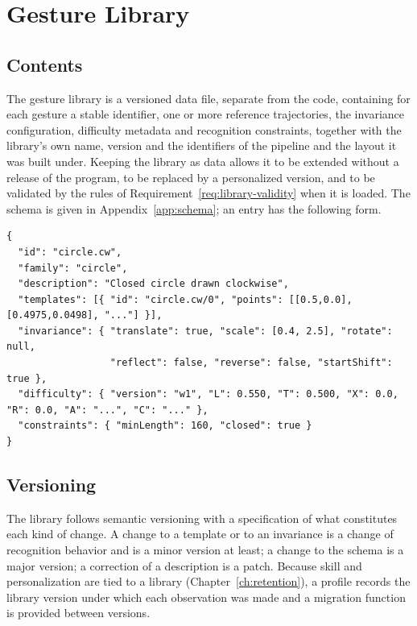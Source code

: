 \chapter{Gesture Library}\label{ch:gesture-library}

\section{Contents}

The gesture library is a versioned data file, separate from the code, containing for each gesture a stable identifier, one or more reference trajectories, the invariance configuration, difficulty metadata and recognition constraints, together with the library's own name, version and the identifiers of the pipeline and the layout it was built under. Keeping the library as data allows it to be extended without a release of the program, to be replaced by a personalized version, and to be validated by the rules of Requirement~\ref{req:library-validity} when it is loaded. The schema is given in Appendix~\ref{app:schema}; an entry has the following form.

\begin{lstlisting}[language=JSONx,caption={A library entry (abbreviated). The component values for the circle are computed from Definition~\ref{def:components} with the default constants; the ambiguity term and the total depend on the rest of the library.},label={lst:entry}]
{
  "id": "circle.cw",
  "family": "circle",
  "description": "Closed circle drawn clockwise",
  "templates": [{ "id": "circle.cw/0", "points": [[0.5,0.0],[0.4975,0.0498], "..."] }],
  "invariance": { "translate": true, "scale": [0.4, 2.5], "rotate": null,
                  "reflect": false, "reverse": false, "startShift": true },
  "difficulty": { "version": "w1", "L": 0.550, "T": 0.500, "X": 0.0, "R": 0.0, "A": "...", "C": "..." },
  "constraints": { "minLength": 160, "closed": true }
}
\end{lstlisting}

\section{Versioning}

The library follows semantic versioning with a specification of what constitutes each kind of change. A change to a template or to an invariance is a change of recognition behavior and is a minor version at least; a change to the schema is a major version; a correction of a description is a patch. Because skill and personalization are tied to a library (Chapter~\ref{ch:retention}), a profile records the library version under which each observation was made and a migration function is provided between versions.

